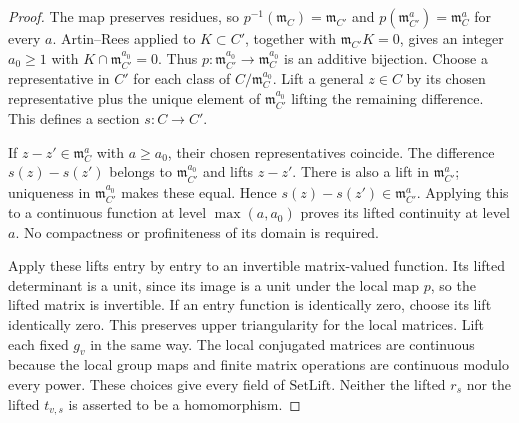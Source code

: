 \documentclass[11pt,a4paper]{article}
\numberwithin{equation}{section}
\theoremstyle{remark}\newtheorem{remark}[theorem]{Remark}
\begin{document}
\begin{proof}
The map preserves residues, so
\(p^{-1}(\mathfrak m_C)=\mathfrak m_{C'}\) and
\(p(\mathfrak m_{C'}^a)=\mathfrak m_C^a\) for every \(a\).
Artin--Rees applied to \(K\subset C'\), together with
\(\mathfrak m_{C'}K=0\), gives an integer \(a_0\ge1\)
with \(K\cap\mathfrak m_{C'}^{a_0}=0\).  Thus
\(p:\mathfrak m_{C'}^{a_0}\to\mathfrak m_C^{a_0}\) is an
additive bijection.  Choose a representative in \(C'\) for
each class of \(C/\mathfrak m_C^{a_0}\).  Lift a general
\(z\in C\) by its chosen representative plus the unique
element of \(\mathfrak m_{C'}^{a_0}\) lifting the remaining
difference.  This defines a section \(s:C\to C'\).

If \(z-z'\in\mathfrak m_C^a\) with \(a\ge a_0\), their
chosen representatives coincide.  The difference \(s(z)-s(z')\)
belongs to \(\mathfrak m_{C'}^{a_0}\) and lifts \(z-z'\).
There is also a lift in \(\mathfrak m_{C'}^a\); uniqueness
in \(\mathfrak m_{C'}^{a_0}\) makes these equal.  Hence
\(s(z)-s(z')\in\mathfrak m_{C'}^a\).  Applying this to a
continuous function at level \(\max(a,a_0)\) proves its lifted
continuity at level \(a\).  No compactness or profiniteness of
its domain is required.

Apply these lifts entry by entry to an invertible matrix-valued
function.  Its lifted determinant is a unit, since its image is
a unit under the local map \(p\), so the lifted matrix is
invertible.  If an entry function is identically zero, choose
its lift identically zero.  This preserves upper triangularity
for the local matrices.  Lift each fixed \(g_v\) in the same
way.  The local conjugated matrices are continuous because the
local group maps and finite matrix operations are continuous
modulo every power.  These choices give every field of
\(\mathrm{SetLift}\).  Neither the lifted \(r_s\) nor the
lifted \(t_{v,s}\) is asserted to be a homomorphism.
\end{proof}

\end{document}
